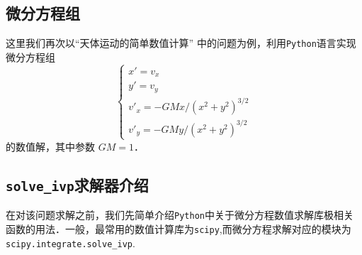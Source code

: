 \subsection{微分方程组}
这里我们再次以“天体运动的简单数值计算” 中的问题为例，利用\verb |Python|语言实现微分方程组
\begin{equation}\label{PyIVP_eq}
\begin{cases}
x' = v_x\\
y' = v_y\\
v'_x = -GMx/(x^2 + y^2)^{3/2}\\
v'_y = -GMy/(x^2 + y^2)^{3/2}
\end{cases}
\end{equation}
的数值解，其中参数 $GM=1$．
\subsection{ \verb|solve_ivp|求解器介绍}
在对该问题求解之前，我们先简单介绍\verb|Python|中关于微分方程数值求解库极相关函数的用法．一般，最常用的数值计算库为\verb|scipy|,而微分方程求解对应的模块为\verb|scipy.integrate.solve_ivp|.

